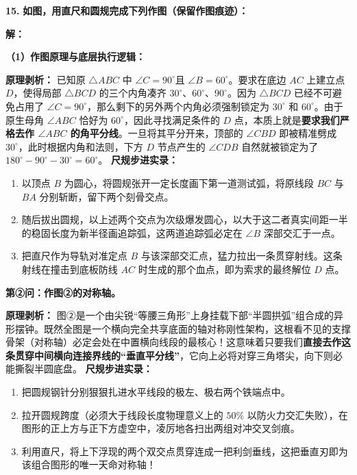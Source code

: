 \textbf{\LARGE 15.} \textbf{如图，用直尺和圆规完成下列作图（保留作图痕迹）：}

\vspace{0.4cm}

\textbf{解：}

\textbf{（1）作图原理与底层执行逻辑：}

\textbf{原理剥析：} 已知原 $\triangle ABC$ 中 $\angle C = 90^\circ$且 $\angle B = 60^\circ$。要求在底边 $AC$ 上建立点 $D$，使得局部 $\triangle BCD$ 的三个内角凑齐 $30^\circ$、$60^\circ$、$90^\circ$。因为 $\triangle BCD$ 已经不可避免占用了 $\angle C = 90^\circ$，那么剩下的另外两个内角必须强制锁定为 $30^\circ$ 和 $60^\circ$。由于原生母角 $\angle ABC$ 恰好为 $60^\circ$，因此寻找满足条件的 $D$ 点，本质上就是\textbf{要求我们严格去作 $\angle ABC$ 的角平分线}。一旦将其平分开来，顶部的 $\angle CBD$ 即被精准劈成 $30^\circ$，此时根据内角和法则，下方 $D$ 节点产生的 $\angle CDB$ 自然就被锁定为了 $180^\circ - 90^\circ - 30^\circ = 60^\circ$。
\textbf{尺规步进实录：}
\begin{enumerate}
    \item 以顶点 $B$ 为圆心，将圆规张开一定长度画下第一道测试弧，将原线段 $BC$ 与 $BA$ 分别斩断，留下两个刻骨交点。
    \item 随后拔出圆规，以上述两个交点为次级爆发圆心，以大于这二者真实间距一半的稳固长度为新半径画追踪弧，这两道追踪弧必定在 $\angle B$ 深部交汇于一点。
    \item 把直尺作为导轨对准定点 $B$ 与该深部交汇点，猛力拉出一条贯穿射线。这条射线在撞击到底板防线 $AC$ 时生成的那个血点，即为索求的最终解位 $D$ 点。
\end{enumerate}

\textbf{第②问：作图②的对称轴。}

\textbf{原理剥析：} 图②是一个由尖锐“等腰三角形”上身挂载下部“半圆拱弧”组合成的异形摆钟。既然全图是一个横向完全共享底面的轴对称刚性架构，这根看不见的支撑骨架（对称轴）必定会处在中置横向线段的最核心！这意味着只要我们\textbf{直接去作这条贯穿中间横向连接界线的“垂直平分线”}，它向上必将对穿三角塔尖，向下则必能撕裂半圆底盘。
\textbf{尺规步进实录：}
\begin{enumerate}
    \item 把圆规钢针分别狠狠扎进水平线段的极左、极右两个铁端点中。
    \item 拉开圆规跨度（必须大于线段长度物理意义上的 $50\%$ 以防火力交汇失败），在图形的正上方与正下方虚空中，凌厉地各扫出两组对冲交叉剑痕。
    \item 利用直尺，将上下浮现的两个双交点贯穿连成一把利剑垂线，这把垂直刃即为该组合图形的唯一天命对称轴！
\end{enumerate}


